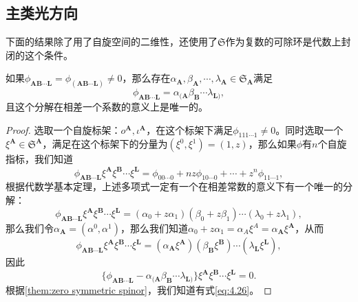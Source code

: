 \subsection{主类光方向}

下面的结果除了用了自旋空间的二维性，还使用了$\mathfrak{S}$作为复数的可除环是代数上封闭的这个条件。

\begin{them}[label={them:3.9}]{}
	如果$\phi _{\boldsymbol{AB} \cdots \boldsymbol{L}} =\phi _{(\boldsymbol{AB} \cdots \boldsymbol{L})} \neq 0$，那么存在$\alpha _{\boldsymbol{A}} ,\beta _{\boldsymbol{A}} ,\cdots ,\lambda _{\boldsymbol{A}} \in \mathfrak{S}_{\boldsymbol{A}}$满足
	\begin{equation}
		\phi _{\boldsymbol{AB} \cdots \boldsymbol{L}} =\alpha _{(\boldsymbol{A}} \beta _{\boldsymbol{B}} \cdots \lambda _{\boldsymbol{L})} ,
		\label{eq:4.26}
	\end{equation}
	且这个分解在相差一个系数的意义上是唯一的。
\end{them}

\begin{proof}
	选取一个自旋标架：$o^{\boldsymbol{A}} ,\iota ^{\boldsymbol{A}}$，在这个标架下满足$\phi _{111\cdots 1} \neq 0$。同时选取一个$\xi ^{\boldsymbol{A}} \in \mathfrak{S}^{\boldsymbol{A}}$，满足在这个标架下的分量为$(\xi ^{0} ,\xi ^{1} )=( 1,z)$，那么如果$\phi $有$n$个自旋指标，我们知道
	\begin{equation*}
		\phi _{\boldsymbol{AB} \cdots \boldsymbol{L}} \xi ^{\boldsymbol{A}} \xi ^{\boldsymbol{B}} \cdots \xi ^{\boldsymbol{L}} =\phi _{00\cdots 0} +nz\phi _{10\cdots 0} +\cdots +z^{n} \phi _{11\cdots 1} ,
	\end{equation*}
	根据代数学基本定理，上述多项式一定有一个在相差常数的意义下有一个唯一的分解：
	\begin{equation*}
		\phi _{\boldsymbol{AB} \cdots \boldsymbol{L}} \xi ^{\boldsymbol{A}} \xi ^{\boldsymbol{B}} \cdots \xi ^{\boldsymbol{L}} =(\alpha _{0} +z\alpha _{1} )(\beta _{0} +z\beta _{1} )\cdots (\lambda _{0} +z\lambda _{1} ),
	\end{equation*}
	那么我们令$\alpha _{\boldsymbol{A}} =(\alpha ^{0} ,\alpha ^{1} )$，那么我们知道$\alpha _{0} +z\alpha _{1} =\alpha _{A} \xi ^{A} =\alpha _{\boldsymbol{A}} \xi ^{\boldsymbol{A}}$，从而
	\begin{equation*}
		\phi _{\boldsymbol{AB} \cdots \boldsymbol{L}} \xi ^{\boldsymbol{A}} \xi ^{\boldsymbol{B}} \cdots \xi ^{\boldsymbol{L}} =(\alpha _{\boldsymbol{A}} \xi ^{\boldsymbol{A}} )(\beta _{\boldsymbol{B}} \xi ^{\boldsymbol{B}} )\cdots (\lambda _{\boldsymbol{L}} \xi ^{\boldsymbol{L}} ),
	\end{equation*}
	因此
	\begin{equation*}
		\{\phi _{\boldsymbol{AB} \cdots \boldsymbol{L}} -\alpha _{(\boldsymbol{A}} \beta _{\boldsymbol{B}} \cdots \lambda _{\boldsymbol{L})}\} \xi ^{\boldsymbol{A}} \xi ^{\boldsymbol{B}} \cdots \xi ^{\boldsymbol{L}} =0.
	\end{equation*}
	根据\ref{them:zero symmetric spinor}，我们知道有式\ref{eq:4.26}。
\end{proof}


